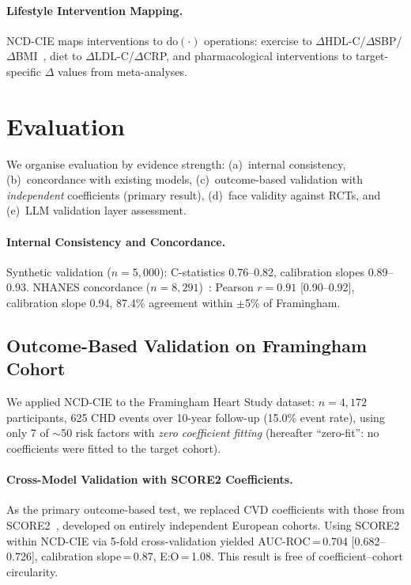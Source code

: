 \documentclass[runningheads]{llncs}
\begin{document}
\paragraph{Lifestyle Intervention Mapping.}
NCD-CIE maps interventions to $\mathrm{do}(\cdot)$ operations:
exercise to $\Delta$HDL-C/$\Delta$SBP/$\Delta$BMI~\cite{naci2019comparative},
diet to $\Delta$LDL-C/$\Delta$CRP, and pharmacological
interventions to target-specific $\Delta$ values from
meta-analyses.

\section{Evaluation}\label{sec:validation}

We organise evaluation by evidence strength:
(a)~internal consistency,
(b)~concordance with existing models,
(c)~outcome-based validation with \emph{independent} coefficients
(primary result),
(d)~face validity against RCTs, and
(e)~LLM validation layer assessment.

\paragraph{Internal Consistency and Concordance.}
Synthetic validation ($n = 5{,}000$): C-statistics 0.76--0.82,
calibration slopes 0.89--0.93.
NHANES concordance ($n = 8{,}291$)~\cite{nhanes2020}:
Pearson $r = 0.91$ [0.90--0.92], calibration slope 0.94,
87.4\% agreement within $\pm$5\% of Framingham.

\subsection{Outcome-Based Validation on Framingham Cohort}\label{sec:framingham}

We applied NCD-CIE to the Framingham Heart Study dataset:
$n = 4{,}172$ participants, 625 CHD events over 10-year follow-up
(15.0\% event rate), using only 7 of ${\sim}$50 risk factors
with \emph{zero coefficient fitting} (hereafter ``zero-fit'':
no coefficients were fitted to the target cohort).

\paragraph{Cross-Model Validation with SCORE2 Coefficients.}
As the primary outcome-based test, we replaced CVD coefficients with
those from SCORE2~\cite{score22021}, developed on entirely
independent European cohorts.
Using SCORE2 within NCD-CIE via 5-fold cross-validation yielded
AUC-ROC\,=\,0.704 [0.682--0.726], calibration slope\,=\,0.87,
E:O\,=\,1.08.
This result is free of coefficient--cohort circularity.
\end{document}
